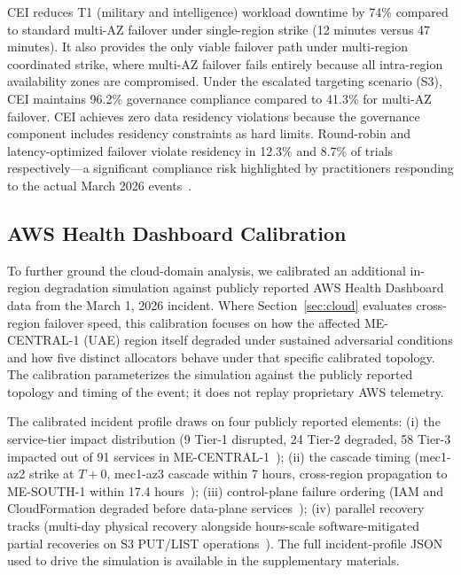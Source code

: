 \documentclass[runningheads]{llncs}
\begin{document}
CEI reduces T1 (military and intelligence) workload downtime by 74\% compared to standard multi-AZ failover under single-region strike (12 minutes versus 47 minutes). It also provides the only viable failover path under multi-region coordinated strike, where multi-AZ failover fails entirely because all intra-region availability zones are compromised. Under the escalated targeting scenario (S3), CEI maintains 96.2\% governance compliance compared to 41.3\% for multi-AZ failover. CEI achieves zero data residency violations because the governance component includes residency constraints as hard limits. Round-robin and latency-optimized failover violate residency in 12.3\% and 8.7\% of trials respectively---a significant compliance risk highlighted by practitioners responding to the actual March 2026 events~\cite{conversation}.

\subsection{AWS Health Dashboard Calibration}
\label{sec:aws_cal}

To further ground the cloud-domain analysis, we calibrated an additional in-region degradation simulation against publicly reported AWS Health Dashboard data from the March 1, 2026 incident. Where Section~\ref{sec:cloud} evaluates cross-region failover speed, this calibration focuses on how the affected ME-CENTRAL-1 (UAE) region itself degraded under sustained adversarial conditions and how five distinct allocators behave under that specific calibrated topology. The calibration parameterizes the simulation against the publicly reported topology and timing of the event; it does not replay proprietary AWS telemetry.

The calibrated incident profile draws on four publicly reported elements: (i) the service-tier impact distribution (9 Tier-1 disrupted, 24 Tier-2 degraded, 58 Tier-3 impacted out of 91 services in ME-CENTRAL-1~\cite{cybersec_news}); (ii) the cascade timing (mec1-az2 strike at $T+0$, mec1-az3 cascade within 7 hours, cross-region propagation to ME-SOUTH-1 within 17.4 hours~\cite{defensescoop,infoq}); (iii) control-plane failure ordering (IAM and CloudFormation degraded before data-plane services~\cite{cybersec_news}); (iv) parallel recovery tracks (multi-day physical recovery alongside hours-scale software-mitigated partial recoveries on S3 PUT/LIST operations~\cite{aws_pes}). The full incident-profile JSON used to drive the simulation is available in the supplementary materials.
\end{document}
